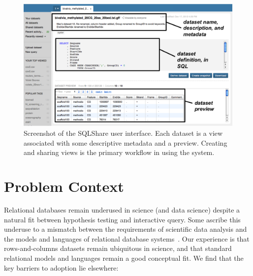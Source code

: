 \documentclass{sig-alternate}
\newcommand{\sqlshare}{SQLShare}
\begin{document}
\begin{figure}[t]
\includegraphics[width=\linewidth]{sqlshare_screenshot.png}
\caption{Screenshot of the \sqlshare{} user interface. Each dataset is a view associated with some descriptive metadata and a preview. Creating and sharing views is the primary workflow in using the system.}
\label{fig:screenshot}
\end{figure}


\section{Problem Context}
Relational databases remain underused in science (and data science) despite a natural
fit between hypothesis testing and interactive query.
Some ascribe this underuse to a mismatch between the requirements of
scientific data analysis and the models and languages of relational database systems~\cite{stonebraker:09}.
Our experience is that rows-and-columns datasets remain ubiquitous
in science, and that standard relational models and languages
remain a good conceptual fit.
We find that the key barriers to adoption lie elsewhere:
\end{document}
